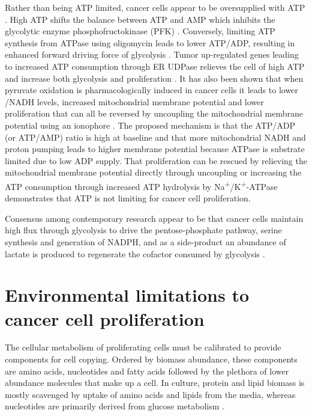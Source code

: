 Rather than being ATP limited, cancer cells appear to be oversupplied with ATP \cite{Scholnick1973-wx}.
High ATP shifts the balance between ATP and AMP which inhibits the glycolytic enzyme phosphofructokinase (PFK) \cite{Dunaway1983-ee}.
Conversely, limiting ATP synthesis from ATPase using oligomycin leads to lower ATP/ADP, resulting in enhanced forward driving force of glycolysis \cite{Park2019-cg}.
Tumor up-regulated genes leading to increased ATP consumption through ER UDPase relieves the cell of high ATP and increase both glycolysis and proliferation \cite{Fang2010-mj, Israelsen2010-ke}.
It has also been shown that when pyruvate oxidation is pharmacologically induced in cancer cells it leads to lower \NAD/NADH levels, increased mitochondrial membrane potential and lower proliferation that can all be reversed by uncoupling the mitochondrial membrane potential using an ionophore \cite{Luengo2021-kb}.
The proposed mechanism is that the ATP/ADP (or ATP/AMP) ratio is high at baseline and that more mitochondrial NADH and proton pumping leads to higher membrane potential because ATPase is substrate limited due to low ADP supply.
That proliferation can be rescued by relieving the mitochondrial membrane potential directly through uncoupling or increasing the ATP consumption through increased ATP hydrolysis by Na\textsuperscript{+}/K\textsuperscript{+}-ATPase demonstrates that ATP is not limiting for cancer cell proliferation.

Consensus among contemporary research appear to be that cancer cells maintain high flux through glycolysis to drive the pentose-phosphate pathway, serine synthesis and generation of NADPH, and as a side-product an abundance of lactate is produced to regenerate the \NAD{} cofactor consumed by glycolysis \cite{Vander_Heiden2017-eq, Chandel2021-rf}.




\section{Environmental limitations to cancer cell proliferation}
The cellular metabolism of proliferating cells must be calibrated to provide components for cell copying.
Ordered by biomass abundance, these components are amino acids, nucleotides and fatty acids followed by the plethora of lower abundance molecules that make up a cell.
In culture, protein and lipid biomass is mostly scavenged by uptake of amino acids and lipids from the media, whereas nucleotides are primarily derived from glucose metabolism \cite{Hosios2016-us}.

